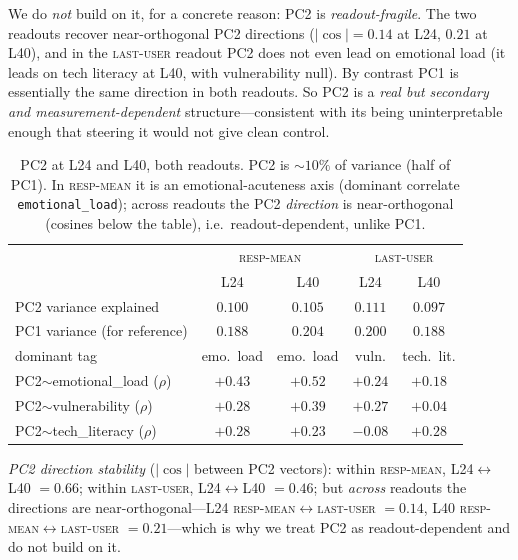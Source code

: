 \documentclass{article}
\newcommand{\respmean}{\textsc{resp-mean}}
\newcommand{\lastuser}{\textsc{last-user}}
\begin{document}
We do \emph{not} build on it, for a concrete reason: PC2 is
\emph{readout-fragile}. The two readouts recover near-orthogonal PC2 directions
($|\cos|{=}0.14$ at L24, $0.21$ at L40), and in the \lastuser{} readout PC2 does not
even lead on emotional load (it leads on tech literacy at L40, with vulnerability
null). By contrast PC1 is essentially the same direction in both readouts. So PC2 is
a \emph{real but secondary and measurement-dependent} structure---consistent with
its being uninterpretable enough that steering it would not give clean control.

\begin{table}[h]
\centering\small
\caption{PC2 at L24 and L40, both readouts. PC2 is ${\sim}10\%$ of variance
(half of PC1). In \respmean{} it is an emotional-acuteness axis (dominant correlate
\texttt{emotional\_load}); across readouts the PC2 \emph{direction} is near-orthogonal
(cosines below the table), i.e.\ readout-dependent, unlike PC1.}
\label{tab:pc2-layers}
\begin{tabular}{lcccc}
\toprule
 & \multicolumn{2}{c}{\respmean{}} & \multicolumn{2}{c}{\lastuser{}} \\
 & L24 & L40 & L24 & L40 \\
\midrule
PC2 variance explained         & $0.100$ & $0.105$ & $0.111$ & $0.097$ \\
PC1 variance (for reference)   & $0.188$ & $0.204$ & $0.200$ & $0.188$ \\
dominant tag                   & emo.\ load & emo.\ load & vuln. & tech.\ lit. \\
PC2$\sim$emotional\_load ($\rho$) & $+0.43$ & $+0.52$ & $+0.24$ & $+0.18$ \\
PC2$\sim$vulnerability ($\rho$)   & $+0.28$ & $+0.39$ & $+0.27$ & $+0.04$ \\
PC2$\sim$tech\_literacy ($\rho$)  & $+0.28$ & $+0.23$ & $-0.08$ & $+0.28$ \\
\bottomrule
\end{tabular}
\end{table}

\noindent\emph{PC2 direction stability} ($|\cos|$ between PC2 vectors):
within \respmean{}, L24$\leftrightarrow$L40 $=0.66$; within \lastuser{},
L24$\leftrightarrow$L40 $=0.46$; but \emph{across} readouts the directions are
near-orthogonal---L24 \respmean{}$\leftrightarrow$\lastuser{} $=0.14$, L40
\respmean{}$\leftrightarrow$\lastuser{} $=0.21$---which is why we treat PC2 as
readout-dependent and do not build on it.

\end{document}
